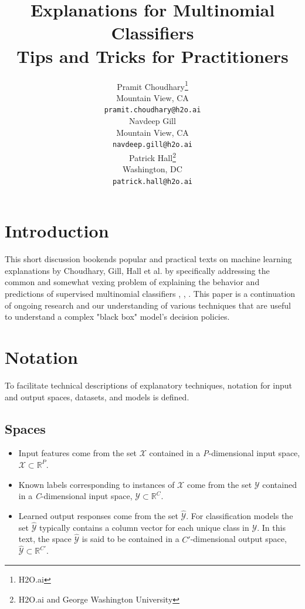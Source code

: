 \documentclass{article}
\title{Explanations for Multinomial Classifiers\\\vspace{10pt}\small{Tips and Tricks for Practitioners}}
\author{
  Pramit Choudhary\thanks{H2O.ai}\\
  Mountain View, CA\\
  \texttt{pramit.choudhary@h2o.ai}\\
  \And
  Navdeep Gill\samethanks\\
  Mountain View, CA\\
  \texttt{navdeep.gill@h2o.ai}\\ 
  \And
  Patrick Hall\thanks{H2O.ai and George Washington University}\\
  Washington, DC\\
  \texttt{patrick.hall@h2o.ai}}
\begin{document}
\maketitle

\begin{abstract}


\end{abstract}

\section{Introduction}

This short discussion bookends popular and practical texts on machine learning explanations by Choudhary, Gill, Hall et al. by specifically addressing the common and somewhat vexing problem of explaining the behavior and predictions of supervised multinomial classifiers \cite{oreillymli}, \cite{art_and_sci}, \cite{oreillyskater} \cite{sarkar2018practical}. This paper is a continuation of ongoing research and our understanding of various techniques that are useful to understand a complex "black box" model's decision policies.


\section{Notation} \label{sec:notation}

To facilitate technical descriptions of explanatory techniques, notation for input and output spaces, datasets, and models is defined.

\subsection{Spaces} 
 
	\begin{itemize}
		\item Input features come from the set $\mathcal{X}$ contained in a \textit{P}-dimensional input space,\\ $\mathcal{X} \subset \mathbb{R}^P$.  
		\item Known labels corresponding to instances of $\mathcal{X}$ come from the set $\mathcal{Y}$ contained in a \textit{C}-dimensional input space, $\mathcal{Y} \subset \mathbb{R}^C$.
		\item Learned output responses come from the set $\hat{\mathcal{Y}}$. For classification models the set $\hat{\mathcal{Y}}$ typically contains a column vector for each unique class in $\mathcal{Y}$. In this text, the space $\hat{\mathcal{Y}}$ is said to be contained in a $C'$-dimensional output space,  $\hat{\mathcal{Y}} \subset \mathbb{R}^{C'}$. 
	\end{itemize}	
	
\end{document}
